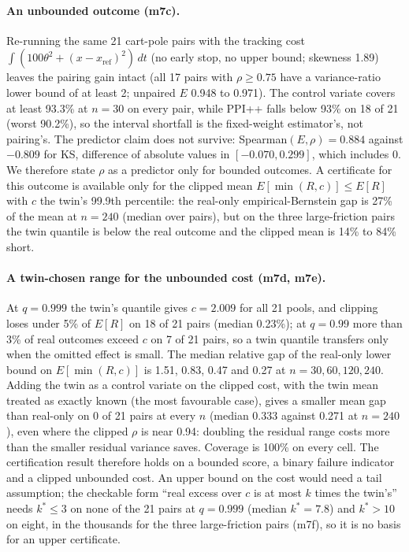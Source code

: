 \documentclass[11pt]{article}
\begin{document}
\paragraph{An unbounded outcome (m7c).} Re-running the same 21 cart-pole pairs with the tracking cost $\int(100\theta^2+(x-x_{\mathrm{ref}})^2)\,dt$ (no early stop, no upper bound; skewness 1.89) leaves the pairing gain intact (all 17 pairs with $\rho\ge0.75$ have a variance-ratio lower bound of at least 2; unpaired $E$ 0.948 to 0.971). The control variate covers at least 93.3\% at $n=30$ on every pair, while PPI++ falls below 93\% on 18 of 21 (worst 90.2\%), so the interval shortfall is the fixed-weight estimator's, not pairing's. The predictor claim does not survive: Spearman$(E,\rho)=0.884$ against $-0.809$ for KS, difference of absolute values in $[-0.070,0.299]$, which includes 0. We therefore state $\rho$ as a predictor only for bounded outcomes. A certificate for this outcome is available only for the clipped mean $E[\min(R,c)]\le E[R]$ with $c$ the twin's 99.9th percentile: the real-only empirical-Bernstein gap is 27\% of the mean at $n=240$ (median over pairs), but on the three large-friction pairs the twin quantile is below the real outcome and the clipped mean is 14\% to 84\% short.

\paragraph{A twin-chosen range for the unbounded cost (m7d, m7e).} At $q=0.999$ the twin's quantile gives $c=2.009$ for all 21 pools, and clipping loses under 5\% of $E[R]$ on 18 of 21 pairs (median 0.23\%); at $q=0.99$ more than 3\% of real outcomes exceed $c$ on 7 of 21 pairs, so a twin quantile transfers only when the omitted effect is small. The median relative gap of the real-only lower bound on $E[\min(R,c)]$ is 1.51, 0.83, 0.47 and 0.27 at $n=30,60,120,240$. Adding the twin as a control variate on the clipped cost, with the twin mean treated as exactly known (the most favourable case), gives a smaller mean gap than real-only on 0 of 21 pairs at every $n$ (median 0.333 against 0.271 at $n=240$), even where the clipped $\rho$ is near 0.94: doubling the residual range costs more than the smaller residual variance saves. Coverage is 100\% on every cell. The certification result therefore holds on a bounded score, a binary failure indicator and a clipped unbounded cost. An upper bound on the cost would need a tail assumption; the checkable form ``real excess over $c$ is at most $k$ times the twin's'' needs $k^*\le 3$ on none of the 21 pairs at $q=0.999$ (median $k^*=7.8$) and $k^*>10$ on eight, in the thousands for the three large-friction pairs (m7f), so it is no basis for an upper certificate.
\end{document}
